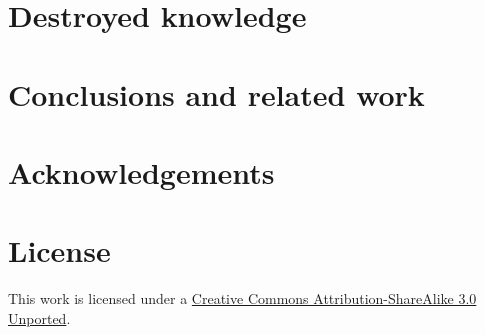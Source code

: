 \documentclass[11pt,twocolumn]{article}
\begin{document}
\section{Destroyed knowledge}

\section{Conclusions and related work}

%



\section*{Acknowledgements}



\section*{License}
This work is licensed under a \href{http://creativecommons.org/licenses/by-sa/3.0/}{Creative Commons Attribution-ShareAlike 3.0 Unported}.
\end{document}
